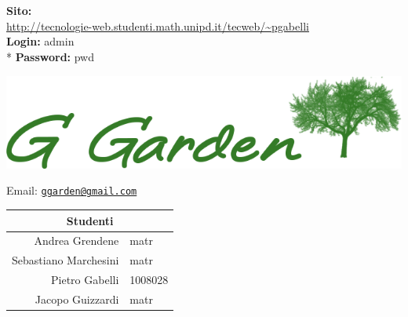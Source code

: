 \thispagestyle{empty}

\begin{titlepage}

	\begin{center}
		\dataUM \\
		\textbf{
			\uni \\
			\cdl \\
			\uniAA \\
		}
		\HRule \\[0.4cm]
			\begin{Huge}
				{\huge \bfseries \titoloDocumento}\\[0.4cm]
			\end{Huge}
		\HRule \\[2.5cm]
		
		\vspace{1cm}
		\textbf{Sito:} \\
		\url{http://tecnologie-web.studenti.math.unipd.it/tecweb/~pgabelli} \\
		\vspace{1cm}
		\textbf{Login:} admin \\*
		\textbf{Password:} pwd \\

		
		
		\begin{center}
			\includegraphics[scale=0.75]{./sezioni/img/Logo.png}
		\end{center}
		Email: 
		\href{mailto:ggarden@gmail.com}{\nolinkurl{ggarden@gmail.com} } \\
		\vspace{3cm}
		

		
		\vfill
		\begin{table}[b]
		\begin{center}
			\begin{tabular}{r | l}
				\multicolumn{2}{c}{\textbf{Studenti}}\\
				\midrule
				Andrea Grendene	&	matr	\\
				Sebastiano Marchesini	&	matr	\\
				Pietro Gabelli	&	1008028	\\
				Jacopo Guizzardi	&	matr	\\
				\midrule
			\end{tabular}
		\end{center}
		\end{table}
	

\end{center}
\end{titlepage}
